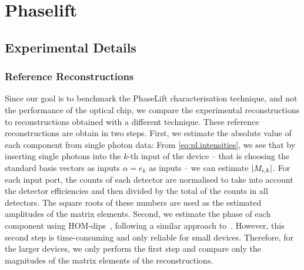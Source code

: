 
\chapter{Phaselift}
\label{cha:phaselift_appendix}

\section{Experimental Details}%
\label{sec:pl.experimental_details}

\subsection{Reference Reconstructions}%
\label{sub:pl.hom_dip}

Since our goal is to benchmark the PhaseLift characterisation technique, and not the performance of the optical chip, we compare the experimental reconstructions to reconstructions obtained with a different technique.
These reference reconstructions are obtain in two steps.
First, we estimate the absolute value of each component from single photon data:
From \cref{eq:pl.intensities}, we see that by inserting single photons into the $k$-th input of the device -- that is choosing the standard basis vectors as inputs $\alpha =  e_k$ as inputs --  we can estimate ${\vert M_{i,k}\vert}$.
For each input port, the counts of each detector are normalised to take into account the detector efficiencies and then divided by the total of the counts in all detectors.
The square roots of these numbers are used as the estimated amplitudes of the matrix elements.
Second, we estimate the phase of each component using HOM-dips~\cite{Hong_1987_Measurement}, following a similar approach to~\cite{Laing_2012_SuperStable,Dhand_2016_Accurate}.
However, this second step is time-consuming and only reliable for small devices.
Therefore, for the larger devices, we only perform the first step and compare only the magnitudes of the matrix elements of the reconstructions.

